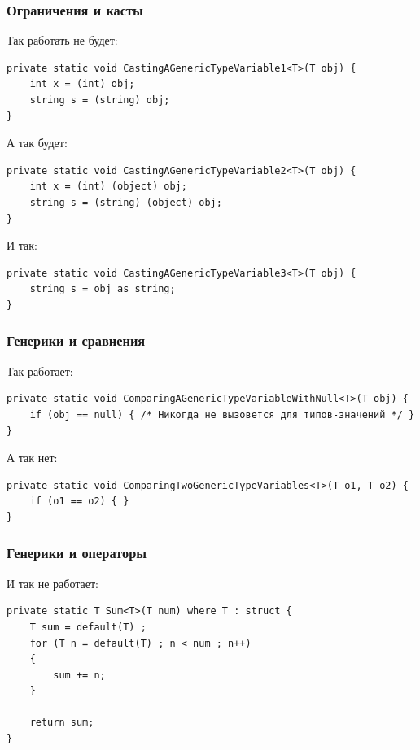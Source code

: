 \documentclass[xetex,mathserif,serif]{beamer}
\begin{document}
	\begin{frame}[fragile]
		\frametitle{Ограничения и касты}
		Так работать не будет:
		\begin{footnotesize}
			\begin{verbatim}
private static void CastingAGenericTypeVariable1<T>(T obj) {
    int x = (int) obj; 
    string s = (string) obj;
}
			\end{verbatim}
		\end{footnotesize}
		\vspace{5mm}
		А так будет:
		\begin{footnotesize}
			\begin{verbatim}
private static void CastingAGenericTypeVariable2<T>(T obj) {
    int x = (int) (object) obj;
    string s = (string) (object) obj; 
}
			\end{verbatim}
		\end{footnotesize}
		\vspace{5mm}
		И так:
		\begin{footnotesize}
			\begin{verbatim}
private static void CastingAGenericTypeVariable3<T>(T obj) {
    string s = obj as string;
}
			\end{verbatim}
		\end{footnotesize}
	\end{frame}

	\begin{frame}[fragile]
		\frametitle{Генерики и сравнения}
		Так работает:
		\begin{footnotesize}
			\begin{verbatim}
private static void ComparingAGenericTypeVariableWithNull<T>(T obj) {
    if (obj == null) { /* Никогда не вызовется для типов-значений */ }
}
			\end{verbatim}
		\end{footnotesize}
		\vspace{5mm}
		А так нет:
		\begin{footnotesize}
			\begin{verbatim}
private static void ComparingTwoGenericTypeVariables<T>(T o1, T o2) {
    if (o1 == o2) { }
}
			\end{verbatim}
		\end{footnotesize}
	\end{frame}

	\begin{frame}[fragile]
		\frametitle{Генерики и операторы}
		И так не работает:
		\begin{footnotesize}
			\begin{verbatim}
private static T Sum<T>(T num) where T : struct {
    T sum = default(T) ;
    for (T n = default(T) ; n < num ; n++)
    {
        sum += n;
    }

    return sum;
}
			\end{verbatim}
		\end{footnotesize}
	\end{frame}
\end{document}
